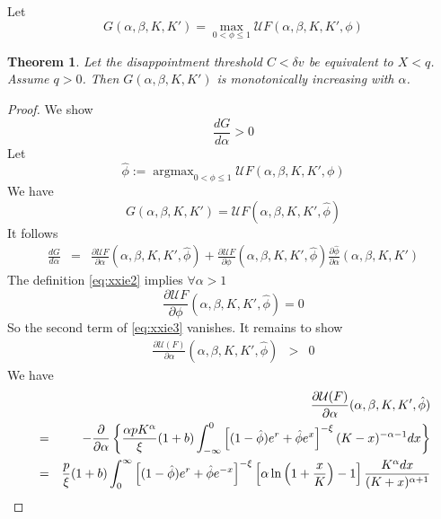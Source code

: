 \documentclass{article}
\newcommand{\td}[2]{
  \frac{d #1}{d #2}
}
\newcommand{\pd}[2]{
  \frac{\partial #1}{\partial #2}
}
\newcommand{\1}[1]{
  \mathbf{1}_{\{#1\}}
}
\DeclareMathOperator*{\argmax}{argmax}
\newtheorem{theorem}{Theorem}
\begin{document}
Let
\[
G(\alpha, \beta, K, K') =
\max_{0 < \phi \leq 1} \mathcal U F(\alpha, \beta, K, K', \phi)
\]

\begin{theorem} \label{thrm:I}
  Let the disappointment threshold $C < \delta v$ be equivalent to $X
  < q$. Assume $q > 0$. Then $G(\alpha, \beta, K, K')$ is
  monotonically increasing with $\alpha$.
\end{theorem}

\begin{proof}
  We show
  \[
  \td{G}{\alpha} > 0
  \]
  Let
  \begin{equation}
    \label{eq:xxie2}
    \hat \phi := \argmax_{0 < \phi \leq 1}
    \mathcal U F(\alpha, \beta, K, K', \phi)
  \end{equation}
  We have
  \[
  G(\alpha, \beta, K, K') = \mathcal U F(\alpha, \beta, K, K', \hat \phi)
  \]
  It follows
  \begin{eqnarray}
    \td{G}{\alpha}
    &=&
    \pd{\mathcal U F}{\alpha}(\alpha, \beta, K, K', \hat \phi)
    + \pd{\mathcal U F}{\phi}(\alpha, \beta, K, K', \hat \phi)
    \pd{\hat \phi}{\alpha}(\alpha, \beta, K, K')
    \label{eq:xxie3}
  \end{eqnarray}
  The definition \eqref{eq:xxie2} implies $\forall \alpha > 1$
  \begin{equation}
    \label{eq:xxie4}
    \pd{\mathcal U F}{\phi}(\alpha, \beta, K, K', \hat \phi) = 0
  \end{equation}
  So the second term of \eqref{eq:xxie3} vanishes. It remains to show
  \begin{eqnarray*}
    \pd{\mathcal U(F)}{\alpha}(\alpha, \beta, K, K', \hat \phi)
    &>& 0
  \end{eqnarray*}
  We have
    \begin{eqnarray*}
      && \pd{\mathcal U(F)}{\alpha}(\alpha, \beta, K, K', \hat \phi) \\
      &=&
      - \frac{\partial}{\partial \alpha} \left\{
        {\alpha p K^\alpha \over \xi} (1 + b)
        \int_{-\infty}^{0}
          \left[
            (1 - \hat\phi) e^r + \hat\phi e^x
          \right]^{-\xi}
          (K - x)^{-\alpha - 1}
        dx \right\} \\
      &=&
      {p \over \xi}
      (1 + b)
      \int_{0}^{\infty}
      \left[
        (1 - \hat\phi) e^r + \hat\phi e^{-x}
      \right]^{-\xi}
      \left[
        \alpha \ln \left(
          1 + {x \over K}
        \right) - 1
      \right]
      {K^{\alpha} dx
        \over
        (K + x)^{\alpha + 1}
      } \\

\end{eqnarray*}
\end{proof}
\end{document}

